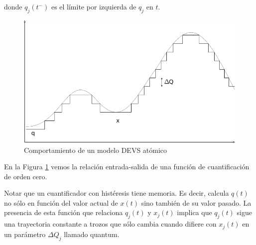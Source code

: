 \documentclass[a4paper,	11pt]{report}
\begin{document}
donde $q_j (t^{-})$ es el límite por izquierda de $q_j$ en $t$.

\begin{figure}[!htbp]
  \includegraphics[scale=0.5]{histeresis0}
  \caption{Comportamiento de un modelo DEVS atómico}
   \label{fig:fig2-2}
\end{figure}

En la Figura \ref{fig:fig2-2} vemos la relación entrada-salida de una función de cuantificación de orden cero.

Notar que un cuantificador con histéresis tiene memoria. Es decir, calcula $q(t)$ no sólo en función del valor actual de $x(t)$ sino también de su valor pasado.
La presencia de esta función que relaciona $q_j (t)$ y $x_j (t)$ implica que $q_j (t)$ sigue una trayectoria constante a trozos que sólo cambia cuando difiere con $x_j (t)$ en un parámetro $\Delta Q_j$ llamado quantum.
\end{document}
